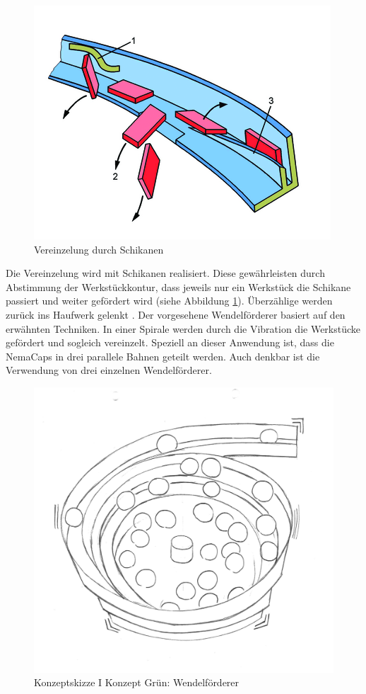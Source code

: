 \begin{figure}
	\includegraphics[scale=2.0]{Illustrationen/5-Konzept/schikane.png}
	\caption{Vereinzelung durch Schikanen}
	\label{fig:schikane}
\end{figure}


Die Vereinzelung wird mit Schikanen realisiert. Diese gewährleisten durch Abstimmung der Werkstückkontur, dass jeweils nur ein Werkstück die Schikane passiert und weiter gefördert wird (siehe Abbildung \ref{fig:schikane}). Überzählige werden zurück ins Haufwerk gelenkt \cite{handling_online}.
\newline
Der vorgesehene Wendelförderer basiert auf den erwähnten Techniken. In einer Spirale werden durch die Vibration die Werkstücke gefördert und sogleich vereinzelt. Speziell an dieser Anwendung ist, dass die NemaCaps in drei parallele Bahnen geteilt werden. Auch denkbar ist die Verwendung von drei einzelnen Wendelförderer.
\newline
\begin{figure}[H]
	\includegraphics[scale=0.6]{Illustrationen/5-Konzept/green_wendelfoerderer.jpg}
	\caption{Konzeptskizze I Konzept Grün: Wendelförderer}
	\label{fig:vereinzelung_green}
\end{figure}

